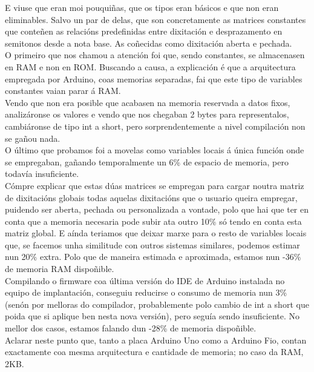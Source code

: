    E viuse que eran moi pouquiñas, que os tipos eran básicos e que non eran
   eliminables. Salvo un par de delas, que son concretamente as matrices
   constantes que conteñen as relacións predefinidas entre dixitación e
   desprazamento en semitonos desde a nota base. As coñecidas como dixitación
   aberta e pechada. \\
   
   O primeiro que nos chamou a atención foi que, sendo constantes, se
   almacenasen en RAM e non en ROM. Buscando a causa, a explicación é que a
   arquitectura empregada por Arduino, coas memorias separadas, fai que este
   tipo de variables constantes vaian parar á RAM. \\
   
   Vendo que non era posible que acabasen na memoria reservada a datos fixos,
   analizáronse os valores e vendo que nos chegaban 2 bytes para representalos,
   cambiáronse de tipo int a short, pero sorprendentemente a nivel compilación
   non se gañou nada. \\
   
   O último que probamos foi a movelas como variables locais á única función
   onde se empregaban, gañando temporalmente un 6\% de espacio de memoria, pero
   todavía insuficiente. \\
   
   Cómpre explicar que estas dúas matrices se empregan para cargar noutra matriz
   de dixitacións globais todas aquelas dixitacións que o usuario queira
   empregar, puidendo ser aberta, pechada ou personalizada a vontade, polo que
   hai que ter en conta que a memoria necesaria pode subir ata outro 10\% só
   tendo en conta esta matriz global. E aínda teriamos que deixar marxe para o
   resto de variables locais que, se facemos unha similitude con outros sistemas
   similares, podemos estimar nun 20\% extra. Polo que de maneira estimada e
   aproximada, estamos nun -36\% de memoria RAM dispoñible. \\
   
   Compilando o firmware coa última versión do IDE de Arduino instalada no
   equipo de implantación, conseguiu reducirse o consumo de memoria nun 3\%
   (senón por melloras do compilador, probablemente polo cambio de int a short
   que poida que si aplique ben nesta nova versión), pero seguía sendo
   insuficiente. No mellor dos casos, estamos falando dun -28\% de memoria
   dispoñible. \\
   
   Aclarar neste punto que, tanto a placa Arduino Uno como a Arduino Fio,
   contan exactamente coa mesma arquitectura e cantidade de memoria; no caso da
   RAM, 2KB. \\
   
